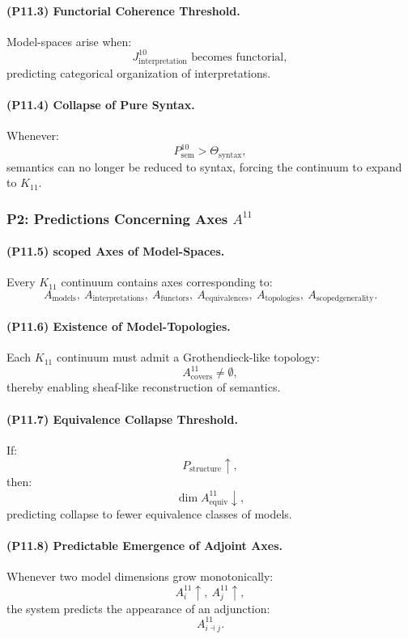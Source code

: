\paragraph{(P11.3) Functorial Coherence Threshold.}
Model-spaces arise when:
\[
J_{\mathrm{interpretation}}^{10}
\text{ becomes functorial},
\]
predicting categorical organization of interpretations.

\paragraph{(P11.4) Collapse of Pure Syntax.}
Whenever:
\[
P_{\mathrm{sem}}^{10} > \Theta_{\mathrm{syntax}},
\]
semantics can no longer be reduced to syntax,
forcing the continuum to expand to $K_{11}$.

\subsubsection{P2: Predictions Concerning Axes $A^{11}$}

\paragraph{(P11.5) scoped Axes of Model-Spaces.}
Every $K_{11}$ continuum contains axes corresponding to:
\[
A_{\mathrm{models}},\
A_{\mathrm{interpretations}},\
A_{\mathrm{functors}},\
A_{\mathrm{equivalences}},\
A_{\mathrm{topologies}},\
A_{\mathrm{scoped generality}}.
\]

\paragraph{(P11.6) Existence of Model-Topologies.}
Each $K_{11}$ continuum must admit a Grothendieck-like topology:
\[
A_{\mathrm{covers}}^{11} \neq \emptyset,
\]
thereby enabling sheaf-like reconstruction of semantics.

\paragraph{(P11.7) Equivalence Collapse Threshold.}
If:
\[
P_{\mathrm{structure}} \uparrow,
\]
then:
\[
\dim A_{\mathrm{equiv}}^{11} \downarrow,
\]
predicting collapse to fewer equivalence classes of models.

\paragraph{(P11.8) Predictable Emergence of Adjoint Axes.}
Whenever two model dimensions grow monotonically:
\[
A_i^{11} \uparrow,\
A_j^{11} \uparrow,
\]
the system predicts the appearance of an adjunction:
\[
A_{i \dashv j}^{11}.
\]

